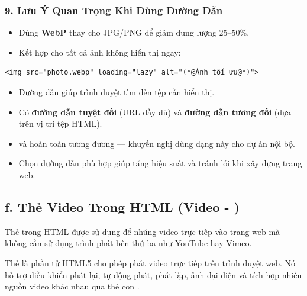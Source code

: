 \subsubsection{9. Lưu Ý Quan Trọng Khi Dùng Đường Dẫn}

\begin{tipBox}
\begin{itemize}[leftmargin=1.5em, itemsep=2pt, parsep=0pt]
    \item Dùng \textbf{WebP} thay cho JPG/PNG để giảm dung lượng 25--50\%.
    \item Kết hợp  cho tất cả ảnh không hiển thị ngay:
\end{itemize}
\begin{codeWindow}
\begin{lstlisting}[language=HTML5]
<img src="photo.webp" loading="lazy" alt="(*@Ảnh tối ưu@*)">
\end{lstlisting}
\end{codeWindow}
\end{tipBox}

\begin{conceptBox}
\begin{itemize}[leftmargin=1.5em, itemsep=3pt, parsep=0pt]
    \item Đường dẫn giúp trình duyệt tìm đến tệp cần hiển thị.
    \item Có \textbf{đường dẫn tuyệt đối} (URL đầy đủ) và \textbf{đường dẫn tương đối} (dựa trên vị trí tệp HTML).
    \item {} và  hoàn toàn tương đương — khuyến nghị dùng dạng này cho dự án nội bộ.
    \item Chọn đường dẫn phù hợp giúp tăng hiệu suất và tránh lỗi khi xây dựng trang web.
\end{itemize}
\end{conceptBox}

\subsection{f. Thẻ Video Trong HTML (Video - )}

Thẻ  trong HTML được sử dụng để nhúng video trực tiếp vào trang web mà không cần sử dụng trình phát bên thứ ba như YouTube hay Vimeo.

\begin{conceptBox}
Thẻ  là phần tử HTML5 cho phép phát video trực tiếp trên trình duyệt web. Nó hỗ trợ điều khiển phát lại, tự động phát, phát lặp, ảnh đại diện và tích hợp nhiều nguồn video khác nhau qua thẻ con .
\end{conceptBox}

